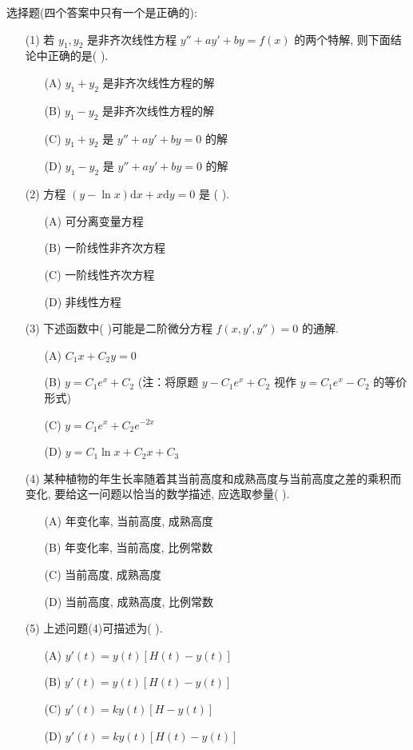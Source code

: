 \documentclass[lang=cn,11pt]{elegantbook}
\begin{document}
\begin{exercise}[微分方程概念辨析]
选择题(四个答案中只有一个是正确的):
\begin{enumerate}
    \item[(1)] 若 $y_1, y_2$ 是非齐次线性方程 $y''+a y'+b y=f(x)$ 的两个特解, 则下面结论中正确的是( ).
    \begin{enumerate}
        \item[(A)] $y_1+y_2$ 是非齐次线性方程的解
        \item[(B)] $y_1-y_2$ 是非齐次线性方程的解
        \item[(C)] $y_1+y_2$ 是 $y''+a y'+b y=0$ 的解
        \item[(D)] $y_1-y_2$ 是 $y''+a y'+b y=0$ 的解
    \end{enumerate}
    \item[(2)] 方程 $(y-\ln x)\mathrm{d}x+x\mathrm{d}y=0$ 是 ( ).
    \begin{enumerate}
        \item[(A)] 可分离变量方程
        \item[(B)] 一阶线性非齐次方程
        \item[(C)] 一阶线性齐次方程
        \item[(D)] 非线性方程
    \end{enumerate}
    \item[(3)] 下述函数中( )可能是二阶微分方程 $f(x,y',y'')=0$ 的通解.
    \begin{enumerate}
        \item[(A)] $C_1x+C_2y=0$
        \item[(B)] $y=C_1e^x+C_2$ (注：将原题 $y-C_1e^x+C_2$ 视作 $y=C_1e^x-C_2$ 的等价形式)
        \item[(C)] $y=C_1e^x+C_2e^{-2x}$
        \item[(D)] $y=C_1\ln x+C_2x+C_3$
    \end{enumerate}
    \item[(4)] 某种植物的年生长率随着其当前高度和成熟高度与当前高度之差的乘积而变化, 要给这一问题以恰当的数学描述, 应选取参量( ).
    \begin{enumerate}
        \item[(A)] 年变化率, 当前高度, 成熟高度
        \item[(B)] 年变化率, 当前高度, 比例常数
        \item[(C)] 当前高度, 成熟高度
        \item[(D)] 当前高度, 成熟高度, 比例常数
    \end{enumerate}
    \item[(5)] 上述问题(4)可描述为( ).
    \begin{enumerate}
        \item[(A)] $y'(t)=y(t)[H(t)-y(t)]$
        \item[(B)] $y'(t)=y(t)[H(t)-y(t)]$
        \item[(C)] $y'(t)=ky(t)[H-y(t)]$
        \item[(D)] $y'(t)=ky(t)[H(t)-y(t)]$
    \end{enumerate}
\end{enumerate}
\end{exercise}
\end{document}
